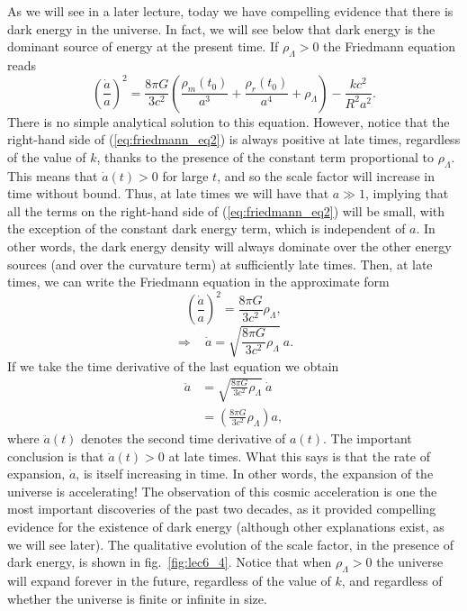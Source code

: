 \documentclass[11pt, a4paper,oneside,openright]{book}
\numberwithin{equation}{section}
\begin{document}
As we will see in a later lecture, today we have compelling evidence that there is dark energy in the universe. In fact, we will see below that dark energy is the dominant source of energy at the present time. If $\rho_{\Lambda}>0$ the Friedmann equation reads
\begin{equation} \label{eq:friedmann_eq2}
\left(\frac{\dot{a}}{a}\right)^2=\frac{8\pi G}{3c^2}\left( \frac{\rho_m(t_0)}{a^3}+\frac{\rho_r(t_0)}{a^4}+\rho_{\Lambda} \right)-\frac{kc^2}{R^2a^2}.
\end{equation}
There is no simple analytical solution to this equation. However, notice that the right-hand side of (\ref{eq:friedmann_eq2}) is always positive at late times, regardless of the value of $k$, thanks to the presence of the constant term proportional to $\rho_{\Lambda}$. This means that $\dot{a}(t)>0$ for large $t$, and so the scale factor will increase in time without bound. Thus, at late times we will have that $a\gg1$, implying that all the terms on the right-hand side of (\ref{eq:friedmann_eq2}) will be small, with the exception of the constant dark energy term, which is independent of $a$. In other words, the dark energy density will always dominate over the other energy sources (and over the curvature term) at sufficiently late times. Then, at late times, we can write the Friedmann equation in the approximate form
\begin{equation}
\left(\frac{\dot{a}}{a}\right)^2=\frac{8\pi G}{3c^2}\rho_{\Lambda},
\end{equation}
\begin{equation}
\Rightarrow~~~~\dot{a}=\sqrt{\frac{8\pi G}{3c^2}\rho_{\Lambda}}~a.
\end{equation}
If we take the time derivative of the last equation we obtain
\begin{equation}
\begin{split}
\ddot{a}&=\sqrt{\frac{8\pi G}{3c^2}\rho_{\Lambda}}~\dot{a}\\
&=\left(\frac{8\pi G}{3c^2}\rho_{\Lambda}\right) a,
\end{split}
\end{equation}
where $\ddot{a}(t)$ denotes the second time derivative of $a(t)$. The important conclusion is that $\ddot{a}(t)>0$ at late times. What this says is that the rate of expansion, $\dot{a}$, is itself increasing in time. In other words, the expansion of the universe is accelerating! The observation of this cosmic acceleration is one the most important discoveries of the past two decades, as it provided compelling evidence for the existence of dark energy (although other explanations exist, as we will see later). The qualitative evolution of the scale factor, in the presence of dark energy, is shown in fig.\ \ref{fig:lec6_4}. Notice that when $\rho_{\Lambda}>0$ the universe will expand forever in the future, regardless of the value of $k$, and regardless of whether the universe is finite or infinite in size.
\end{document}
